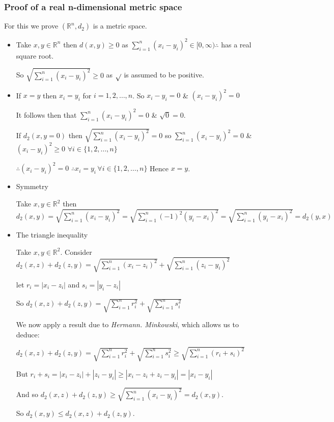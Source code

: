 \documentclass[10pt]{article}
\begin{document}
\subsubsection{Proof of a real n-dimensional metric space}
For this we prove $(\mathbb{R}^{n}, d_{2})$ is a metric space.
\begin{itemize}
    \item[\textbf{M1)}] Take $x,y\in\mathbb{R}^{n}$ then $d(x,y)\geq0$ as $\sum^{n}_{i=1}(x_{i}-y_{i})^{2}\in[0,\infty)\therefore$ has a real square root.
    
    So $\sqrt{\sum^{n}_{i=1}(x_{i}-y_{i})^{2}}\geq0$ as $\sqrt{\empty}$ is assumed to be positive.

    \item[\textbf{M2)}] If $x=y$ then $x_{i}=y_{i}$ for $i=1,2,\dots,n$. So $x_{i}-y_{i}=0$ \& $(x_{i}-y_{i})^{2}=0$

    It follows then that $\sum^{n}_{i=1}(x_{i}-y_{i})^{2}=0$ \& $\sqrt{0}=0$.

    If $d_{2}(x,y=0)$ then $\sqrt{\sum^{n}_{i=1}(x_{i}-y_{i})^{2}}=0$ so $\sum^{n}_{i=1}(x_{i}-y_{i})^{2}=0$ \& $(x_{i}-y_{i})^{2}\geq0$ $\forall i\in\{1,2,\dots,n\}$

    $\therefore (x_{i}-y_{i})^{2}=0$ $\therefore x_{i}=y_{i}\,\forall i\in\{1,2,\dots,n\}$ Hence $x=y$.

    \item[\textbf{M3)}] Symmetry

    Take $x,y\in\mathbb{R}^{2}$ then $d_{2}(x,y)=\sqrt{\sum^{n}_{i=1}(x_{i}-y_{i})^{2}}=\sqrt{\sum^{n}_{i=1}(-1)^{2}(y_{i}-x_{i})^{2}}=\sqrt{\sum^{n}_{i=1}(y_{i}-x_{i})^{2}}=d_{2}(y,x)$

    \item[\textbf{M4)}] The triangle inequality

    Take $x,y\in\mathbb{R}^{2}$. Consider $d_{2}(x,z)+d_{2}(z,y)=\sqrt{\sum^{n}_{i=1}(x_{i}-z_{i})^{2}}+\sqrt{\sum^{n}_{i=1}(z_{i}-y_{i})^{2}}$
    
    let $r_{i}=|x_{i}-z_{i}|$ and $s_{i}=|y_{i}-z_{i}|$

    So $d_{2}(x,z)+d_{2}(z,y)=\sqrt{\sum^{n}_{i=1}r_{i}^{2}}+\sqrt{\sum^{n}_{i=1}s_{i}^{2}}$

    We now apply a result due to \emph{Hermann. Minkowski}, which allows us to deduce:

    $d_{2}(x,z)+d_{2}(z,y)=\sqrt{\sum^{n}_{i=1}r_{i}^{2}}+\sqrt{\sum^{n}_{i=1}s_{i}^{2}}\geq\sqrt{\sum^{n}_{i=1}(r_{i}+s_{i})^{2}}$

    But $r_{i}+s_{i}=|x_{i}-z_{i}|+|z_{i}-y_{i}|\geq|x_{i}-z_{i}+z_{i}-y_{i}|=|x_{i}-y_{i}|$

    And so $d_{2}(x,z)+d_{2}(z,y)\geq\sqrt{\sum^{n}_{i=1}(x_{i}-y_{i})^{2}}=d_{2}(x,y)$. 

    So $d_{2}(x,y)\leq d_{2}(x,z)+d_{2}(z,y)$.
\end{itemize}
\end{document}
